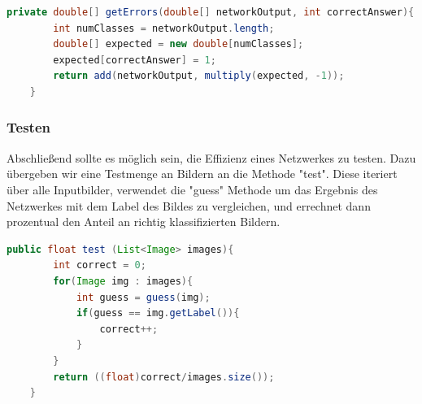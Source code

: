 \documentclass[12pt]{article}
\begin{document}
\begin{lstlisting}[language=Java]
private double[] getErrors(double[] networkOutput, int correctAnswer){
        int numClasses = networkOutput.length;
        double[] expected = new double[numClasses];
        expected[correctAnswer] = 1;
        return add(networkOutput, multiply(expected, -1));
    }
\end{lstlisting}

\subsubsection{Testen}

Abschließend sollte es möglich sein, die Effizienz eines Netzwerkes zu testen. Dazu übergeben wir eine Testmenge an Bildern an die Methode "test". Diese iteriert über alle Inputbilder, verwendet die "guess" Methode um das Ergebnis des Netzwerkes mit dem Label des Bildes zu vergleichen, und errechnet dann prozentual den Anteil an richtig klassifizierten Bildern.

\begin{lstlisting}[language=Java]
    public float test (List<Image> images){
        int correct = 0;
        for(Image img : images){
            int guess = guess(img);
            if(guess == img.getLabel()){
                correct++;
            }
        }
        return ((float)correct/images.size());
    }
 \end{lstlisting}
\end{document}
